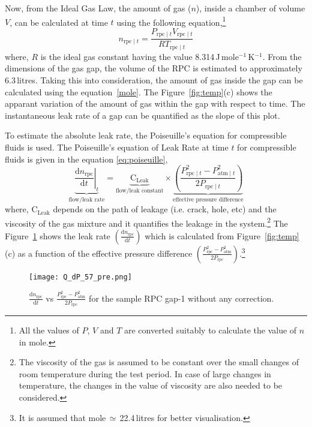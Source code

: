 Now, from the Ideal Gas Law, the amount of gas ($n$), inside a chamber of
volume $V$, can be calculated at time $t$ using the following equation,\footnote{All the values of $P$, $V$ and $T$ are converted suitably to calculate the value of $n$ in mole.}
\begin{equation}
  n_{\textrm{rpc}\mid t}=\frac{P_{\textrm{rpc}\mid t}V_{\textrm{rpc}\mid t}}{RT_{\textrm{rpc}\mid t}} \label{mole}
\end{equation}
where, $R$ is the ideal gas constant having the value
8.314\,J\,mole$^{-1}$\,K$^{-1}$. From the dimensions of the gas gap, the volume
of the RPC is estimated to approximately 6.3\,litres. Taking this into
consideration, the amount of gas inside the gap can be calculated using the
equation~\ref{mole}. The Figure~\ref{fig:temp}(c) shows the apparant variation
of the amount of gas within the gap with respect to time. The instantaneous
leak rate of a gap can be quantified as the slope of this plot.

To estimate the absolute leak rate, the Poiseuille's equation for compressible
fluids\cite{poiseuille} is used. The Poiseuille's equation of Leak Rate at time
$t$ for compressible fluids is given in the equation \ref{eq:poiseuille},
\begin{equation}
  \underbrace{\left.\frac{\mathrm{d}n_{\textrm{rpc}}}{\mathrm{d}t}\right| _t}_\text{flow/leak rate}=\underbrace{\textrm{C}_{\textrm{Leak}}}_\text{flow/leak constant}\times\underbrace{\left(\frac {P_{{\textrm{rpc}\mid t} }^{2}-P_{{\textrm{atm}\mid t} }^{2}}{2P_{{\textrm{rpc}\mid t} }}\right)}_\text{effective pressure difference}\label{eq:poiseuille}
\end{equation}
where, $\textrm{C}_{\textrm{Leak}}$ depends on the path of leakage (i.e. crack,
hole, etc) and the viscosity of the gas mixture and it quantifies the leakage
in the system.\footnote{The viscosity of the gas is assumed to be constant over
  the small changes of room temperature during the test period. In case of
  large changes in temperature, the changes in the value of viscosity are also
  needed to be considered.} The Figure~\ref{fig:preQt} shows the leak rate
$\left(\frac{\mathrm{d}n_{\textrm{rpc}}}{\mathrm{d}t}\right)$ which is calculated
from Figure~\ref{fig:temp}(c) as a function of the effective pressure
difference $\left(\frac{P_{\textrm{rpc}}^{2}-P_{\textrm{atm}}^{2}}{2P_{\textrm{rpc}}}\right)$.\footnote{It is assumed that mole\,$\simeq$\,22.4\,litres for better visualisation.} 
\begin{figure}
  \centering
  \texttt{[image: Q\_dP\_57\_pre.png]}
  \caption{$\frac{\mathrm{d}n_{\textrm{rpc}}}{\mathrm{d}t}$ vs
    $\frac{P_{\textrm{rpc}}^{2}-P_{\textrm{atm}}^{2}}{2P_{\textrm{rpc}}}$ for the sample
    RPC gap-1 without any correction.}
  \label{fig:preQt}
\end{figure}

